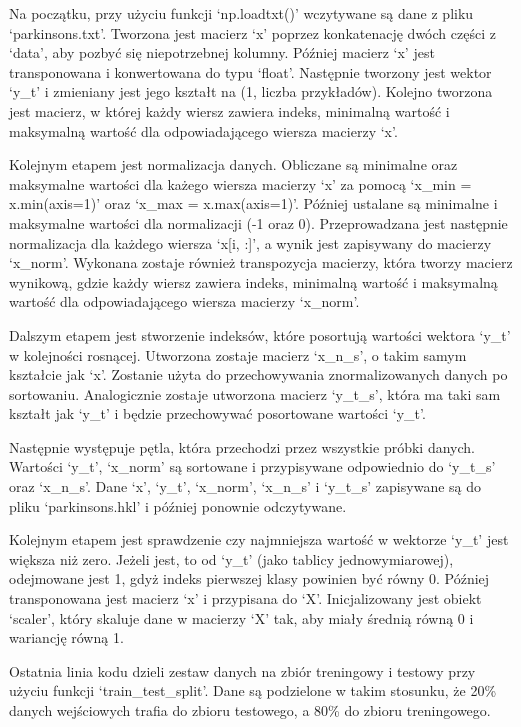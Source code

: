 \documentclass[a4paper]{article}
\begin{document}
Na początku, przy użyciu funkcji `np.loadtxt()' wczytywane są dane z pliku `parkinsons.txt'.
Tworzona jest macierz `x' poprzez konkatenację dwóch części z `data', aby pozbyć się niepotrzebnej kolumny.
Później macierz `x' jest transponowana i konwertowana do typu `float'.
Następnie tworzony jest wektor `y\_t' i zmieniany jest jego kształt na (1, liczba przykładów).
Kolejno tworzona jest macierz, w której każdy wiersz zawiera indeks, minimalną wartość i maksymalną wartość dla odpowiadającego wiersza macierzy `x'.

Kolejnym etapem jest normalizacja danych.
Obliczane są minimalne oraz maksymalne wartości dla każego wiersza macierzy `x' za pomocą `x\_min = x.min(axis=1)' oraz `x\_max = x.max(axis=1)'.
Później ustalane są minimalne i maksymalne wartości dla normalizacji (-1 oraz 0).
Przeprowadzana jest następnie normalizacja dla każdego wiersza `x[i, :]', a wynik jest zapisywany do macierzy `x\_norm'.
Wykonana zostaje również transpozycja macierzy, która tworzy macierz wynikową, gdzie każdy wiersz zawiera indeks, minimalną wartość i maksymalną wartość dla odpowiadającego wiersza macierzy `x\_norm'.

Dalszym etapem jest stworzenie indeksów, które posortują wartości wektora `y\_t' w kolejności rosnącej.
Utworzona zostaje macierz `x\_n\_s', o takim samym kształcie jak `x'. Zostanie użyta do przechowywania znormalizowanych danych po sortowaniu.
Analogicznie zostaje utworzona macierz `y\_t\_s', która ma taki sam kształt jak `y\_t' i będzie przechowywać posortowane wartości `y\_t'.

Następnie występuje pętla, która przechodzi przez wszystkie próbki danych.
Wartości `y\_t', `x\_norm' są sortowane i przypisywane odpowiednio do `y\_t\_s' oraz `x\_n\_s'.
Dane `x', `y\_t', `x\_norm', `x\_n\_s' i `y\_t\_s' zapisywane są do pliku `parkinsons.hkl' i później ponownie odczytywane.

Kolejnym etapem jest sprawdzenie czy najmniejsza wartość w wektorze `y\_t' jest większa niż zero.
Jeżeli jest, to od `y\_t' (jako tablicy jednowymiarowej), odejmowane jest 1, gdyż indeks pierwszej klasy powinien być równy 0.
Później transponowana jest macierz `x' i przypisana do `X'.
Inicjalizowany jest obiekt `scaler', który skaluje dane w macierzy `X' tak, aby miały średnią równą 0 i wariancję równą 1.

Ostatnia linia kodu dzieli zestaw danych na zbiór treningowy i testowy przy użyciu funkcji `train\_test\_split'.
Dane są podzielone w takim stosunku, że 20\% danych wejściowych trafia do zbioru testowego, a 80\% do zbioru treningowego.
\end{document}
